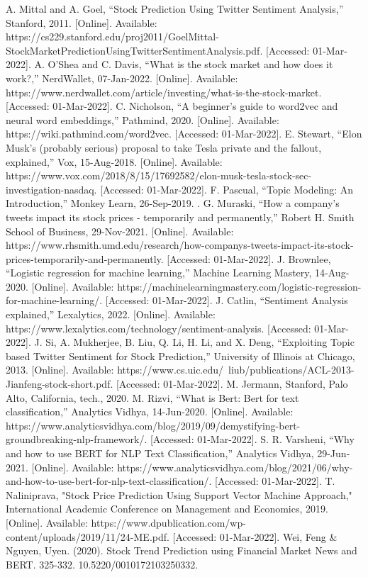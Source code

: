 \documentclass[conference]{IEEEtran}
\begin{document}
\begin{thebibliography}{00}
     A. Mittal and A. Goel, “Stock Prediction Using Twitter Sentiment Analysis,” Stanford, 2011. [Online]. Available: https://cs229.stanford.edu/proj2011/GoelMittal-StockMarketPredictionUsingTwitterSentimentAnalysis.pdf. [Accessed: 01-Mar-2022].
     A. O'Shea and C. Davis, “What is the stock market and how does it work?,” NerdWallet, 07-Jan-2022. [Online]. Available: https://www.nerdwallet.com/article/investing/what-is-the-stock-market. [Accessed: 01-Mar-2022].
     C. Nicholson, “A beginner's guide to word2vec and neural word embeddings,” Pathmind, 2020. [Online]. Available: https://wiki.pathmind.com/word2vec. [Accessed: 01-Mar-2022].
     E. Stewart, “Elon Musk's (probably serious) proposal to take Tesla private and the fallout, explained,” Vox, 15-Aug-2018. [Online]. Available: https://www.vox.com/2018/8/15/17692582/elon-musk-tesla-stock-sec-investigation-nasdaq. [Accessed: 01-Mar-2022].
     F. Pascual, “Topic Modeling: An Introduction,” Monkey Learn, 26-Sep-2019. .
     G. Muraski, “How a company's tweets impact its stock prices - temporarily and permanently,” Robert H. Smith School of Business, 29-Nov-2021. [Online]. Available: https://www.rhsmith.umd.edu/research/how-companys-tweets-impact-its-stock-prices-temporarily-and-permanently. [Accessed: 01-Mar-2022].
     J. Brownlee, “Logistic regression for machine learning,” Machine Learning Mastery, 14-Aug-2020. [Online]. Available: https://machinelearningmastery.com/logistic-regression-for-machine-learning/. [Accessed: 01-Mar-2022].
     J. Catlin, “Sentiment Analysis explained,” Lexalytics, 2022. [Online]. Available: https://www.lexalytics.com/technology/sentiment-analysis. [Accessed: 01-Mar-2022].
     J. Si, A. Mukherjee, B. Liu, Q. Li, H. Li, and X. Deng, “Exploiting Topic based Twitter Sentiment for Stock Prediction,” University of Illinois at Chicago, 2013. [Online]. Available: https://www.cs.uic.edu/~liub/publications/ACL-2013-Jianfeng-stock-short.pdf. [Accessed: 01-Mar-2022].
     M. Jermann, Stanford, Palo Alto, California, tech., 2020.
     M. Rizvi, “What is Bert: Bert for text classification,” Analytics Vidhya, 14-Jun-2020. [Online]. Available: https://www.analyticsvidhya.com/blog/2019/09/demystifying-bert-groundbreaking-nlp-framework/. [Accessed: 01-Mar-2022].
     S. R. Varsheni, “Why and how to use BERT for NLP Text Classification,” Analytics Vidhya, 29-Jun-2021. [Online]. Available: https://www.analyticsvidhya.com/blog/2021/06/why-and-how-to-use-bert-for-nlp-text-classification/. [Accessed: 01-Mar-2022].
     T. Naliniprava, "Stock Price Prediction Using Support Vector Machine Approach," International Academic Conference on Management and Economics, 2019. [Online]. Available: https://www.dpublication.com/wp-content/uploads/2019/11/24-ME.pdf. [Accessed: 01-Mar-2022].
     Wei, Feng \& Nguyen, Uyen. (2020). Stock Trend Prediction using Financial Market News and BERT. 325-332. 10.5220/0010172103250332.
\end{thebibliography}
\end{document}
